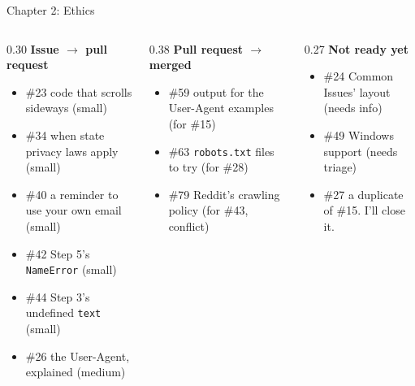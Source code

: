 \documentclass[9pt,aspectratio=169]{beamer}
\begin{document}
\begin{frame}{Chapter 2: Ethics}
    \begin{columns}[T]
        \begin{column}{0.30\textwidth}
            \textbf{Issue $\to$ pull request}
            \begin{itemize}\small
                \item \#23 code that scrolls sideways (small)
                \item \#34 when state privacy laws apply (small)
                \item \#40 a reminder to use your own email (small)
                \item \#42 Step 5's \texttt{NameError} (small)
                \item \#44 Step 3's undefined \texttt{text} (small)
                \item \#26 the User-Agent, explained (medium)
            \end{itemize}
        \end{column}
        \begin{column}{0.38\textwidth}
            \textbf{Pull request $\to$ merged}
            \begin{itemize}\small
                \item \#59 output for the User-Agent examples (for \#15)
                \item \#63 \texttt{robots.txt} files to try (for \#28)
                \item \#79 Reddit's crawling policy (for \#43, conflict)
            \end{itemize}
        \end{column}
        \begin{column}{0.27\textwidth}
            \textbf{Not ready yet}
            \begin{itemize}\small
                \item \#24 Common Issues' layout (needs info)
                \item \#49 Windows support (needs triage)
                \item \#27 a duplicate of \#15. I'll close it.
            \end{itemize}
        \end{column}
    \end{columns}
\end{frame}
\end{document}
